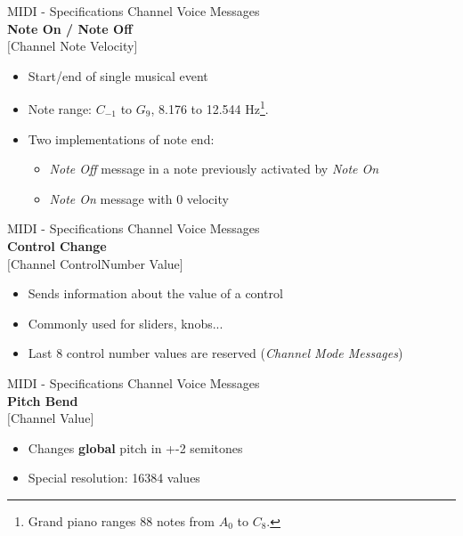 \documentclass{beamer}
\begin{document}
\begin{frame}{MIDI - Specifications}
    Channel Voice Messages\\
    \vspace{5mm}
    \textbf{Note On / Note Off}\\
    $[$Channel Note Velocity$]$
    \vspace{5mm}
    \begin{itemize}
        \item Start/end of single musical event
        \item Note range: $C_{-1}$ to $G_9$, 8.176 to 12.544 Hz\footnote{Grand piano ranges 88 notes from $A_0$ to $C_8$.}.
        \item Two implementations of note end:
        \begin{itemize}
            \item \textit{Note Off} message in a note previously activated by \textit{Note On}
            \item \textit{Note On} message with 0 velocity
        \end{itemize}
    \end{itemize}
\end{frame}

\begin{frame}{MIDI - Specifications}
    Channel Voice Messages\\
    \vspace{5mm}
    \textbf{Control Change}\\
    $[$Channel ControlNumber Value$]$
    \vspace{5mm}
    \begin{itemize}
        \item Sends information about the value of a control
        \item Commonly used for sliders, knobs...
        \item Last 8 control number values are reserved (\textit{Channel Mode Messages})
    \end{itemize}
\end{frame}

\begin{frame}{MIDI - Specifications}
    Channel Voice Messages\\
    \vspace{5mm}
    \textbf{Pitch Bend}\\
    $[$Channel Value$]$
    \vspace{5mm}
    \begin{itemize}
        \item Changes \textbf{global} pitch in +-2 semitones
        \item Special resolution: 16384 values
    \end{itemize}
\end{frame}
\end{document}
